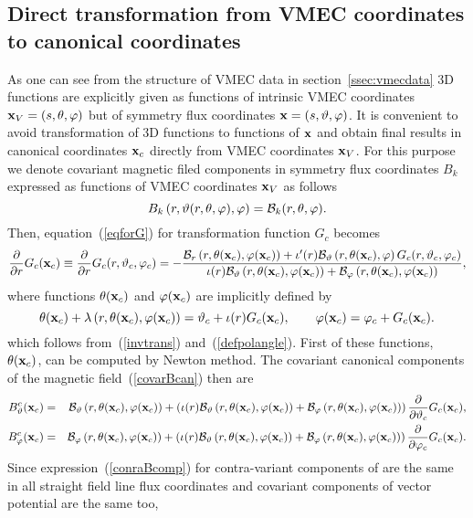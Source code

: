 \documentclass[12pt]{article}
\newcommand{\be}[1]{\begin{equation} \label{#1}}
\newcommand{\ee}{\end{equation}}
\newcommand{\bea}[1]{\begin{eqnarray} \label{#1}}
\newcommand{\eea}{\end{eqnarray}}
\newcommand{\eq}[1]{(\ref{#1})}
\newcommand{\difp}[2]{\frac{\partial #1}{\partial #2}}
\newcommand{\bx}{{\bf x}}
\newcommand{\cB}{{\cal B}}
\begin{document}
\subsection{Direct transformation from VMEC coordinates to canonical coordinates}

\noindent
As one can see from the structure of VMEC data in section~\ref{ssec:vmecdata}
3D functions are explicitly given as functions of intrinsic VMEC coordinates $\bx_V=(s,\theta,\varphi)$
but of symmetry flux coordinates $\bx=(s,\vartheta,\varphi)$. It is convenient to avoid transformation
of 3D functions to functions of $\bx$ and obtain final results in canonical coordinates $\bx_c$
directly from VMEC coordinates $\bx_V$. For this purpose we denote covariant magnetic filed 
components in symmetry flux coordinates $B_k$ expressed as functions of VMEC coordinates $\bx_V$ as
follows
\be{dentcov}
B_k\left(r,\vartheta(r,\theta,\varphi),\varphi\right)=\cB_k(r,\theta,\varphi).
\ee
Then, equation~\eq{eqforG} for transformation function $G_c$ becomes
\be{eqforG_VMEC}
\difp{}{r}G_c(\bx_c)\equiv
\difp{}{r}G_c(r,\vartheta_c,\varphi_c)=
-\frac{\cB_r\left(r,\theta(\bx_c),\varphi(\bx_c)\right)
+\iota^\prime(r) \cB_\vartheta\left(r,\theta(\bx_c),\varphi\right) G_c(r,\vartheta_c,\varphi_c)}
{\iota(r)\cB_\vartheta\left(r,\theta(\bx_c),\varphi(\bx_c)\right)
+\cB_\varphi\left(r,\theta(\bx_c),\varphi(\bx_c)\right)},
\ee
where functions $\theta(\bx_c)$ and $\varphi(\bx_c)$ are implicitly defined by
\be{vmec_via_can}
\theta(\bx_c) + \lambda\left(r,\theta(\bx_c),\varphi(\bx_c)\right) = \vartheta_c+\iota(r)G_c(\bx_c),
\qquad
\varphi(\bx_c) = \varphi_c+G_c(\bx_c).
\ee
which follows from~\eq{invtrans} and~\eq{defpolangle}. First of these functions, $\theta(\bx_c)$, can be
computed by Newton method. The covariant canonical components of the magnetic field~\eq{covarBcan} then are
\bea{covarBcan_VMEC}
B_\vartheta^c(\bx_c)
&=&
\cB_\vartheta\left(r,\theta(\bx_c),\varphi(\bx_c)\right) + 
\left(\iota(r) \cB_\vartheta\left(r,\theta(\bx_c),\varphi(\bx_c)\right)
+\cB_\varphi\left(r,\theta(\bx_c),\varphi(\bx_c)\right)\right)\difp{}{\vartheta_c}G_c(\bx_c),
\nonumber \\
B_\varphi^c(\bx_c)
&=&
\cB_\varphi\left(r,\theta(\bx_c),\varphi(\bx_c)\right) 
+ \left(\iota(r) \cB_\vartheta\left(r,\theta(\bx_c),\varphi(\bx_c)\right)
+\cB_\varphi\left(r,\theta(\bx_c),\varphi(\bx_c)\right)\right)\difp{}{\varphi_c}G_c(\bx_c).
\eea
Since expression~\eq{conraBcomp} for contra-variant components of are the same in all straight field line
flux coordinates and covariant components of vector potential are the same too,
\end{document}

